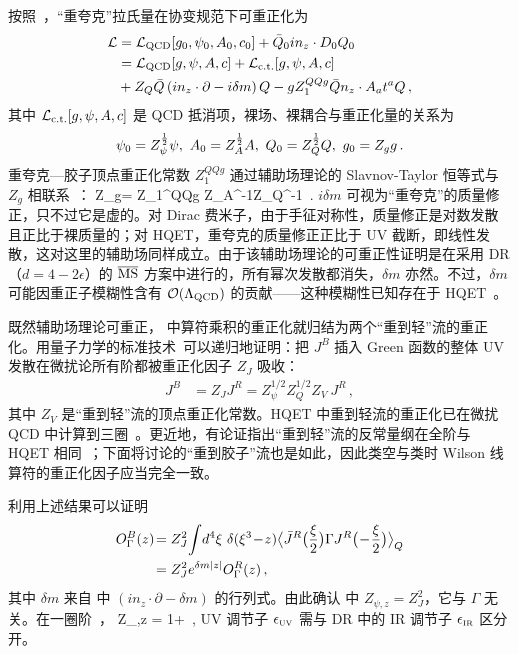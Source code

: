 按照~\cite{Dorn:1986dt}，``重夸克''拉氏量在协变规范下可重正化为
\begin{align}\label{eq:auxl}
	{\cal L} &= {\cal L}_{\rm QCD}[g_0,\psi_0,A_0,c_0] + \bar{Q}_0in_z\cdot D_0 Q_0\nonumber\\
	&={\cal L}_{\rm QCD}[g,\psi,A,c] +  {\cal L}_{\rm c.t.}[g,\psi,A,c] \nonumber\\
	& +  Z_Q\bar{Q}\left(in_z\cdot \partial - i\delta m\right) Q - g Z_{1}^{QQg}\bar{Q}n_z\cdot A_at^aQ\,,
\end{align}
其中 ${\cal L}_{\rm c.t.}[g,\psi,A,c]$ 是 QCD 抵消项，裸场、裸耦合与重正化量的关系为
\begin{align}
	\psi_0=Z_\psi^{1\over2}\psi, \ A_0 = Z_A^{1\over2} A,\ Q_0 = Z_Q^{1\over2} Q,\ g_0=Z_gg\,.
\end{align}
重夸克—胶子顶点重正化常数 $Z_1^{QQg}$ 通过辅助场理论的 Slavnov-Taylor 恒等式与 $Z_g$ 相联系~\cite{Dorn:1986dt}：
\beq
Z_g= Z_1^{QQg} Z_A^{-{1}}Z_Q^{-1}	\,.
\eeq
$i\delta m$ 可视为``重夸克''的质量修正，只不过它是虚的。对 Dirac 费米子，由于手征对称性，质量修正是对数发散且正比于裸质量的；对 HQET，重夸克的质量修正正比于 UV 截断，即线性发散，这对这里的辅助场同样成立。由于该辅助场理论的可重正性证明是在采用 DR（$d=4-2\epsilon$）的 ${\overline{\rm MS}}$ 方案中进行的，所有幂次发散都消失，$\delta m$ 亦然。不过，$\delta m$ 可能因重正子模糊性含有 ${\cal O}(\Lambda_{\text{QCD}})$ 的贡献——这种模糊性已知存在于 HQET~\cite{Bigi:1994em,Beneke:1994sw}。

既然辅助场理论可重正， 中算符乘积的重正化就归结为两个``重到轻''流的重正化。用量子力学的标准技术~\cite{Collins:1984xc}可以递归地证明：把 $J^B$ 插入 Green 函数的整体 UV 发散在微扰论所有阶都被重正化因子 $Z_J$ 吸收：
\begin{align}
	J^B&=Z_{J}J^R = Z_{\psi}^{1/2}Z_{Q}^{1/2}Z_{V}\ J^R\,,
\end{align}
其中 $Z_{V}$ 是``重到轻''流的顶点重正化常数。HQET 中重到轻流的重正化已在微扰 QCD 中计算到三圈~\cite{Shifman:1986sm,Politzer:1988wp,Ji:1991pr,Chetyrkin:2003vi,Broadhurst:1991fz}。更近地，有论证指出``重到轻''流的反常量纲在全阶与 HQET 相同~\cite{Braun:2020ymy}；下面将讨论的``重到胶子''流也是如此，因此类空与类时 Wilson 线算符的重正化因子应当完全一致。

利用上述结果可以证明
\begin{align} \label{eq:renproof}
	O^B_\Gamma(z)\!&= Z_J^2\!\int\! d^4\xi\ \delta(\xi^3\!-\!z)\big\langle \bar{J}^R\big({\xi\over2}\big) \Gamma  J^R\big(\!-\!{\xi\over2}\big)\big\rangle_Q\nn\\
	&= Z_J^2 e^{\delta m|z|} O^R_\Gamma(z)\,,
\end{align}
其中 $\delta m$ 来自  中 $(in_z\cdot \partial - \delta m)$ 的行列式。由此确认  中 $Z_{\psi,z} =  Z_J^2 $，它与 $\Gamma$ 无关。在一圈阶~\cite{Stefanis:1983ke}，
\beq \label{eq:zpsiz}
Z_{\psi,z} = 1+ \,,
\eeq
UV 调节子 $\epsilon_{\mbox{\tiny UV}}$ 需与 DR 中的 IR 调节子 $\epsilon_{\mbox{\tiny IR}}$ 区分开。

